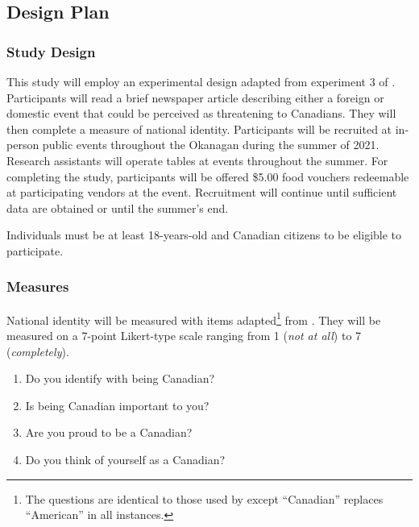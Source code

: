 \documentclass[
]{book}
\providecommand{\tightlist}{%
  \setlength{\itemsep}{0pt}\setlength{\parskip}{0pt}}
\begin{document}
\hypertarget{design-plan-1}{%
\subsection{Design Plan}\label{design-plan-1}}

\hypertarget{study-design-1}{%
\subsubsection{Study Design}\label{study-design-1}}

This study will employ an experimental design adapted from experiment 3 of \citet{davies2008}. Participants will read a brief newspaper article describing either a foreign or domestic event that could be perceived as threatening to Canadians. They will then complete a measure of national identity. Participants will be recruited at in-person public events throughout the Okanagan during the summer of 2021. Research assistants will operate tables at events throughout the summer. For completing the study, participants will be offered \$5.00 food vouchers redeemable at participating vendors at the event. Recruitment will continue until sufficient data are obtained or until the summer's end.

Individuals must be at least 18-years-old and Canadian citizens to be eligible to participate.

\hypertarget{measures-2}{%
\subsubsection{Measures}\label{measures-2}}

National identity will be measured with items adapted\footnote{The questions are identical to those used by \citet{davies2008} except ``Canadian'' replaces ``American'' in all instances.} from \citet{davies2008}. They will be measured on a 7-point Likert-type scale ranging from 1 (\emph{not at all}) to 7 (\emph{completely}).

\begin{enumerate}
\def\labelenumi{\arabic{enumi}.}
\tightlist
\item
  Do you identify with being Canadian?
\item
  Is being Canadian important to you?
\item
  Are you proud to be a Canadian?
\item
  Do you think of yourself as a Canadian?
\end{enumerate}
\end{document}
